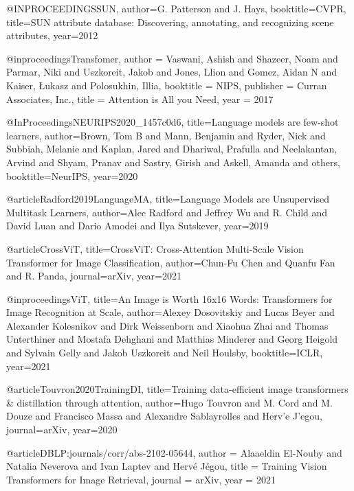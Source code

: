 @INPROCEEDINGS{SUN,  author={G. {Patterson} and J. {Hays}},  booktitle={CVPR},   title={SUN attribute database: Discovering, annotating, and recognizing scene attributes},   year={2012}}



@inproceedings{Transfomer,
 author = {Vaswani, Ashish and Shazeer, Noam and Parmar, Niki and Uszkoreit, Jakob and Jones, Llion and Gomez, Aidan N and Kaiser, \L ukasz and Polosukhin, Illia},
 booktitle = {NIPS},
 publisher = {Curran Associates, Inc.},
 title = {Attention is All you Need},
 year = {2017}
}


@InProceedings{NEURIPS2020_1457c0d6,
  title={Language models are few-shot learners},
  author={Brown, Tom B and Mann, Benjamin and Ryder, Nick and Subbiah, Melanie and Kaplan, Jared and Dhariwal, Prafulla and Neelakantan, Arvind and Shyam, Pranav and Sastry, Girish and Askell, Amanda and others},
  booktitle={NeurIPS},
  year={2020}
}



@article{Radford2019LanguageMA,
  title={Language Models are Unsupervised Multitask Learners},
  author={Alec Radford and Jeffrey Wu and R. Child and David Luan and Dario Amodei and Ilya Sutskever},
  year={2019}
}


@article{CrossViT,
  title={CrossViT: Cross-Attention Multi-Scale Vision Transformer for Image Classification},
  author={Chun-Fu Chen and Quanfu Fan and R. Panda},
  journal={arXiv},
  year={2021}
 }

@inproceedings{ViT,
title={An Image is Worth 16x16 Words: Transformers for Image Recognition at Scale},
author={Alexey Dosovitskiy and Lucas Beyer and Alexander Kolesnikov and Dirk Weissenborn and Xiaohua Zhai and Thomas Unterthiner and Mostafa Dehghani and Matthias Minderer and Georg Heigold and Sylvain Gelly and Jakob Uszkoreit and Neil Houlsby},
booktitle={ICLR},
year={2021}
}



@article{Touvron2020TrainingDI,
  title={Training data-efficient image transformers & distillation through attention},
  author={Hugo Touvron and M. Cord and M. Douze and Francisco Massa and Alexandre Sablayrolles and Herv'e J'egou},
  journal={arXiv},
  year={2020}
}


@article{DBLP:journals/corr/abs-2102-05644,
  author    = {Alaaeldin El{-}Nouby and
               Natalia Neverova and
               Ivan Laptev and
               Herv{\'{e}} J{\'{e}}gou},
  title     = {Training Vision Transformers for Image Retrieval},
  journal   = {arXiv},
  year      = {2021}
}

